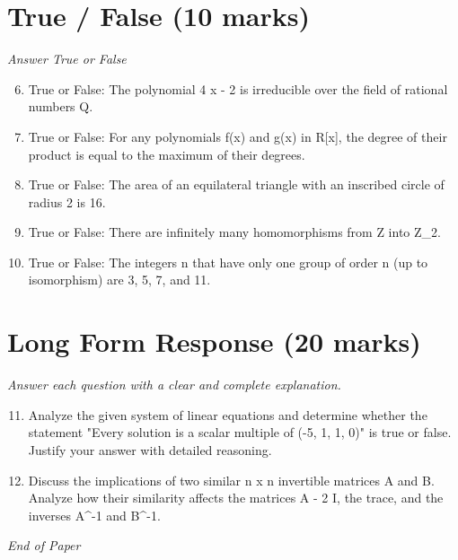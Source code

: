 \documentclass[12pt]{article}
\begin{document}
\section*{True / False (10 marks)}
\textit{Answer True or False}
\begin{enumerate}[label=\arabic*.]
\setcounter{enumi}{5}
\item True or False: The polynomial 4 x - 2 is irreducible over the field of rational numbers Q.
\item True or False: For any polynomials f(x) and g(x) in R[x], the degree of their product is equal to the maximum of their degrees.
\item True or False: The area of an equilateral triangle with an inscribed circle of radius 2 is 16.
\item True or False: There are infinitely many homomorphisms from Z into Z\_2.
\item True or False: The integers n that have only one group of order n (up to isomorphism) are 3, 5, 7, and 11.
\end{enumerate}

\section*{Long Form Response (20 marks)}
\textit{Answer each question with a clear and complete explanation.}
\begin{enumerate}[label=\arabic*.]
\setcounter{enumi}{10}
\item Analyze the given system of linear equations and determine whether the statement "Every solution is a scalar multiple of (-5, 1, 1, 0)" is true or false. Justify your answer with detailed reasoning.
\item Discuss the implications of two similar n x n invertible matrices A and B. Analyze how their similarity affects the matrices A - 2 I, the trace, and the inverses A^-1 and B^-1.
\end{enumerate}

\vfill
\noindent\textit{End of Paper}
\end{document}

